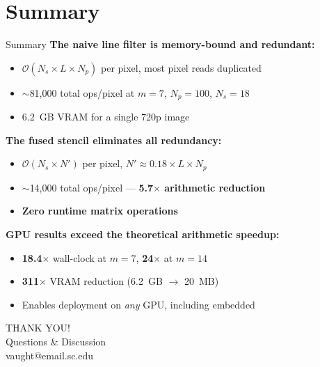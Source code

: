 \documentclass[10pt, aspectratio=169]{beamer}
\begin{document}
\sectionsubtitle{}
\section{Summary}

\begin{frame}{Summary}
  \textbf{The naive line filter is memory-bound and redundant:}
  \begin{itemize}
    \item $\mathcal{O}(N_s \times L \times N_p)$ per pixel, most pixel reads duplicated
    \item $\sim$81,000 total ops/pixel at $m{=}7$, $N_p{=}100$, $N_s{=}18$
    \item 6.2~GB VRAM for a single 720p image
  \end{itemize}

  \vspace{0.6em}
  \textbf{The fused stencil eliminates all redundancy:}
  \begin{itemize}
    \item $\mathcal{O}(N_s \times N')$ per pixel, $N' \approx 0.18 \times L \times N_p$
    \item $\sim$14,000 total ops/pixel --- \textbf{5.7$\times$ arithmetic reduction}
    \item \textbf{Zero runtime matrix operations}
  \end{itemize}

  \vspace{0.6em}
  \textbf{GPU results exceed the theoretical arithmetic speedup:}
  \begin{itemize}
    \item \textbf{18.4$\times$} wall-clock at $m{=}7$, \textbf{24$\times$} at $m{=}14$
    \item \textbf{311$\times$} VRAM reduction (6.2~GB $\to$ 20~MB)
    \item Enables deployment on \emph{any} GPU, including embedded
  \end{itemize}
\end{frame}

{
  \begin{frame}[plain]
    \vfill
    \centering
    {\fontsize{50}{55}\selectfont\impactfont\color{UofSCWhite} THANK YOU!}\\[1em]
    {\Large\color{UofSCWhite} Questions \& Discussion}\\[0.5em]
    {\normalsize\color{UofSCGray30} vaught@email.sc.edu}
    \vfill
  \end{frame}
}
\end{document}
